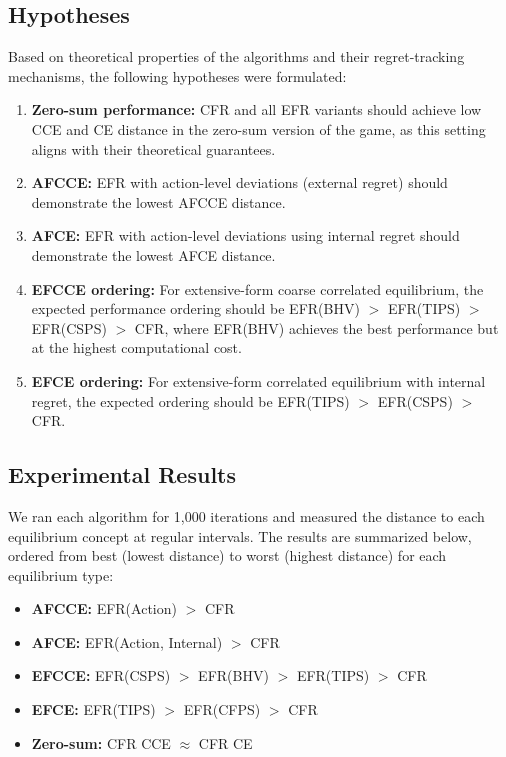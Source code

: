 \documentclass[11pt]{article}
\begin{document}
\subsection{Hypotheses}

Based on theoretical properties of the algorithms and their regret-tracking mechanisms, the following hypotheses were formulated:

\begin{enumerate}
    \item \textbf{Zero-sum performance:} CFR and all EFR variants should achieve low CCE and CE distance in the zero-sum version of the game, as this setting aligns with their theoretical guarantees.

    \item \textbf{AFCCE:} EFR with action-level deviations (external regret) should demonstrate the lowest AFCCE distance.

    \item \textbf{AFCE:} EFR with action-level deviations using internal regret should demonstrate the lowest AFCE distance.

    \item \textbf{EFCCE ordering:} For extensive-form coarse correlated equilibrium, the expected performance ordering should be EFR(BHV) $>$ EFR(TIPS) $>$ EFR(CSPS) $>$ CFR, where EFR(BHV) achieves the best performance but at the highest computational cost.

    \item \textbf{EFCE ordering:} For extensive-form correlated equilibrium with internal regret, the expected ordering should be EFR(TIPS) $>$ EFR(CSPS) $>$ CFR.
\end{enumerate}

\subsection{Experimental Results}

We ran each algorithm for 1,000 iterations and measured the distance to each equilibrium concept at regular intervals. The results are summarized below, ordered from best (lowest distance) to worst (highest distance) for each equilibrium type:

\begin{itemize}
    \item \textbf{AFCCE:} EFR(Action) $>$ CFR
    \item \textbf{AFCE:} EFR(Action, Internal) $>$ CFR
    \item \textbf{EFCCE:} EFR(CSPS) $>$ EFR(BHV) $>$ EFR(TIPS) $>$ CFR
    \item \textbf{EFCE:} EFR(TIPS) $>$ EFR(CFPS) $>$ CFR
    \item \textbf{Zero-sum:} CFR CCE $\approx$ CFR CE
\end{itemize}
\end{document}

